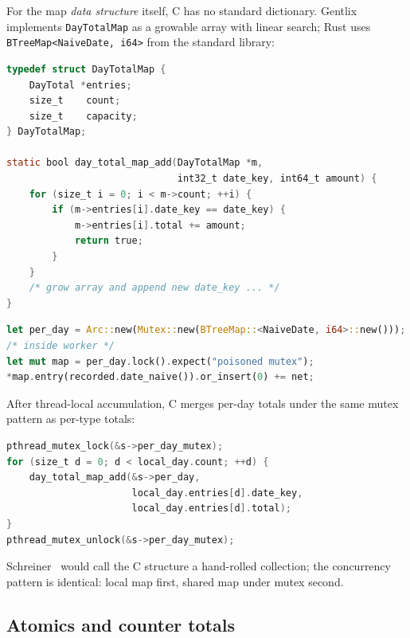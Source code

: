 For the map \emph{data structure} itself, C has no standard dictionary. Gentlix implements
\texttt{DayTotalMap} as a growable array with linear search; Rust uses
\texttt{BTreeMap<NaiveDate, i64>} from the standard library:

\begin{lstlisting}[language=C, caption={transaction\_service.c --- Ad hoc per-day map:
linear scan, then merge under \texttt{per\_day\_mutex}.}]
typedef struct DayTotalMap {
    DayTotal *entries;
    size_t    count;
    size_t    capacity;
} DayTotalMap;

static bool day_total_map_add(DayTotalMap *m,
                              int32_t date_key, int64_t amount) {
    for (size_t i = 0; i < m->count; ++i) {
        if (m->entries[i].date_key == date_key) {
            m->entries[i].total += amount;
            return true;
        }
    }
    /* grow array and append new date_key ... */
}
\end{lstlisting}

\begin{lstlisting}[language=Rust, caption={transaction.rs (service) --- Standard
map; mutex wraps updates in the worker loop.}]
let per_day = Arc::new(Mutex::new(BTreeMap::<NaiveDate, i64>::new()));
/* inside worker */
let mut map = per_day.lock().expect("poisoned mutex");
*map.entry(recorded.date_naive()).or_insert(0) += net;
\end{lstlisting}

After thread-local accumulation, C merges per-day totals under the same mutex pattern
as per-type totals:

\begin{lstlisting}[language=C, caption={transaction\_service.c --- Per-day merge
after the hot loop.}]
pthread_mutex_lock(&s->per_day_mutex);
for (size_t d = 0; d < local_day.count; ++d) {
    day_total_map_add(&s->per_day,
                      local_day.entries[d].date_key,
                      local_day.entries[d].total);
}
pthread_mutex_unlock(&s->per_day_mutex);
\end{lstlisting}

Schreiner~\cite{Schreiner1993} would call the C structure a hand-rolled collection;
the concurrency pattern is identical: local map first, shared map under mutex second.

\subsection{Atomics and counter totals}
\label{subsec:ch5sec3atomics}


